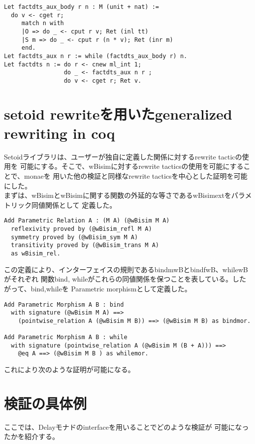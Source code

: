 \documentclass[japanese]{jssst_ppl}
\theoremstyle{definition}
\begin{document}
\begin{verbatim}
Let factdts_aux_body r n : M (unit + nat) :=
  do v <- cget r;
     match n with
     |O => do _ <- cput r v; Ret (inl tt)
     |S m => do _ <- cput r (n * v); Ret (inr m)
     end.
Let factdts_aux n r := while (factdts_aux_body r) n.
Let factdts n := do r <- cnew ml_int 1;
                 do _ <- factdts_aux n r ;
                 do v <- cget r; Ret v.
            \end{verbatim}

\section{setoid rewriteを用いたgeneralized rewriting in coq}
Setoidライブラリは、ユーザーが独自に定義した関係に対するrewrite tacticの使用を
可能にする。そこで、wBisimに対するrewrite tacticsの使用を可能にすることで、monaeを
用いた他の検証と同様なrewrite tacticsを中心とした証明を可能にした。\\

まずは、wBisimとwBisimに関する関数の外延的な等さであるwBisimextをパラメトリック同値関係として
定義した。
\begin{verbatim}
Add Parametric Relation A : (M A) (@wBisim M A)
  reflexivity proved by (@wBisim_refl M A)
  symmetry proved by (@wBisim_sym M A)
  transitivity proved by (@wBisim_trans M A)
  as wBisim_rel.
        \end{verbatim}
この定義により、インターフェイスの規則であるbindmwBとbindfwB、whilewBがそれぞれ
関数bind, whileがこれらの同値関係を保つことを表している。したがって、bind,whileを
Parametric morphismとして定義した。
\begin{verbatim}
Add Parametric Morphism A B : bind
  with signature (@wBisim M A) ==>
    (pointwise_relation A (@wBisim M B)) ==> (@wBisim M B) as bindmor.

Add Parametric Morphism A B : while
  with signature (pointwise_relation A (@wBisim M (B + A))) ==>
    @eq A ==> (@wBisim M B ) as whilemor.
        \end{verbatim}
これにより次のような証明が可能になる。



\section{検証の具体例}
ここでは、Delayモナドのinterfaceを用いることでどのような検証が
可能になったかを紹介する。
\end{document}
